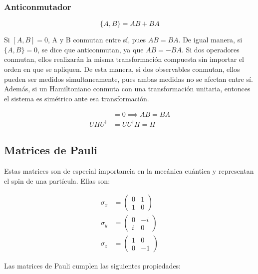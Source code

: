 \subsubsection{Anticonmutador}

\begin{equation}
    \{A,B\} = A B + B A
\end{equation}

Si $[A,B] = 0$, A y B conmutan entre sí, pues $AB = BA$. De igual manera, si $\{A,B\} = 0$, se dice que anticonmutan, ya que $AB = -BA$. Si dos operadores conmutan, ellos realizarán la misma transformación compuesta sin importar el orden en que se apliquen. De esta manera, si dos observables conmutan, ellos pueden ser medidos simultaneamente, pues ambas medidas no se afectan entre sí. Además, si un Hamiltoniano conmuta con una transformación unitaria, entonces el sistema es simétrico ante esa transformación.

\begin{align*}
    [A,B] &= 0 \implies A B = B A \\
    U H U^\dagger &= U U^\dagger H = H
\end{align*}


\subsection{Matrices de Pauli}

Estas matrices son de especial importancia en la mecánica cuántica y representan el spin de una partícula. Ellas son:

\begin{align}
    \sigma_x &=
        \begin{pmatrix}
            0 & 1 \\
            1 & 0
        \end{pmatrix} \\
    \sigma_y &=
        \begin{pmatrix}
            0 & -i \\
            i & 0
        \end{pmatrix} \\
    \sigma_z &=
        \begin{pmatrix}
            1 & 0 \\
            0 & -1
        \end{pmatrix}
\end{align}

Las matrices de Pauli cumplen las siguientes propiedades:


